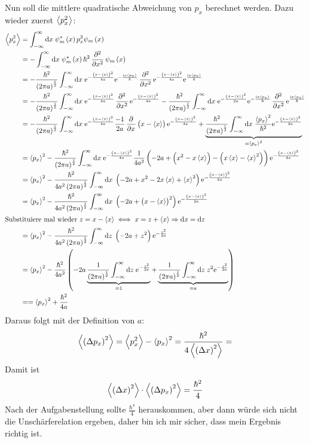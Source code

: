 Nun soll die mittlere quadratische Abweichung von $p_x$ berechnet werden. Dazu wieder zuerst $\left\langle p_x^2\right\rangle$:
\begin{align*}
	\mw{p_x^2}&=\ui{x}\psi_m^*\del{x}p_x^2\psi_m\del{x}\\
	&=-\ui{x}\psi_m^*\del{x}\hbar^2\dpd[2]{}{x}\psi_m\del{x}\\
	&=-\frac{\hbar^2}{\del{2\pi a}^{\frac12}}\ui{x}\ee^{-\frac{\del{x-\mw{x}}^2}{4a}}\ee^{-\frac{\ii x\mw{p_x}}{\hbar}}
	\dpd[2]{}{x}\ee^{-\frac{\del{x-\mw{x}}^2}{4a}}\ee^{\frac{\ii x\mw{p_x}}{\hbar}}\\
	&=-\frac{\hbar^2}{\del{2\pi a}^{\frac12}}\ui{x}\ee^{-\frac{\del{x-\mw{x}}^2}{4a}}\dpd[2]{}{x}\ee^{-\frac{\del{x-\mw{x}}^2}{4a}}
	-\frac{\hbar^2}{\del{2\pi a}^{\frac12}}\ui{x}\ee^{-\frac{\del{x-\mw{x}}^2}{2a}}\ee^{-\frac{\ii x\mw{p_x}}{\hbar}}
	\dpd[2]{}{x}\ee^{\frac{\ii x\mw{p_x}}{\hbar}}\\
	&=-\frac{\hbar^2}{\del{2\pi a}^{\frac12}}\ui{x}\ee^{-\frac{\del{x-\mw{x}}^2}{4a}}
	\frac{-1}{2a}\dpd{}x\del{x-\mw{x}}\ee^{-\frac{\del{x-\mw{x}}^2}{4a}}
	+\underbrace{\frac{\hbar^2}{\del{2\pi a}^{\frac12}}\ui{x}\frac{\mw{p_x}^2}{\hbar^2}\ee^{-\frac{\del{x-\mw{x}}^2}{2a}}}_{=\mw{p_x}^2}\\
	&=\mw{p_x}^2-\frac{\hbar^2}{\del{2\pi a}^{\frac12}}\ui{x}\ee^{-\frac{\del{x-\mw{x}}^2}{4a}}
	\frac1{4a^2}\del{-2a+\del{x^2-x\mw{x}}-\del{x\mw{x}-\mw{x}^2}}\ee^{-\frac{\del{x-\mw{x}}^2}{4a}}\\
	&=\mw{p_x}^2-\frac{\hbar^2}{4a^2\del{2\pi a}^{\frac12}}\ui{x}\del{-2a+x^2-2x\mw{x}+\mw{x}^2}\ee^{-\frac{\del{x-\mw{x}}^2}{2a}}\\
	&=\mw{p_x}^2-\frac{\hbar^2}{4a^2\del{2\pi a}^{\frac12}}\ui{x}\del{-2a+\del{x-\mw{x}}^2}\ee^{-\frac{\del{x-\mw{x}}^2}{2a}}\\
	\intertext{%
		Substituiere mal wieder $z=x-\mw{x}\iff x=z+\mw{x}\Rightarrow\dif x=\dif z$
	}
	&=\mw{p_x}^2-\frac{\hbar^2}{4a^2\del{2\pi a}^{\frac12}}\ui{z}\del{-2a+z^2}\ee^{-\frac{z^2}{2a}}\\
	&=\mw{p_x}^2-\frac{\hbar^2}{4a^2}\del{-2a\underbrace{\frac1{\del{2\pi a}^{\frac12}}\ui{z}\ee^{-\frac{z^2}{2a}}}_{=1}
	+\underbrace{\frac1{\del{2\pi a}^{\frac12}}\ui{z}z^2\ee^{-\frac{z^2}{2a}}}_{=a}}\\
	&==\mw{p_x}^2+\frac{\hbar^2}{4a}
\end{align*}
Daraus folgt mit der Definition von $a$:
\[
	\mw{\del{\Delta p_x}^2}=\mw{p_x^2}-\mw{p_x}^2=\frac{\hbar^2}{4\mw{\del{\Delta x}^2}}=
\]
Damit ist
\[
	\mw{\del{\Delta x}^2}\cdot\mw{\del{\Delta p_x}^2}=\frac{\hbar^2}4
\]
Nach der Aufgabenstellung sollte $\frac{\hbar^4}4$ herauskommen, aber dann würde sich nicht die Unschärferelation ergeben, daher bin ich mir sicher, dass mein Ergebnis richtig ist.


